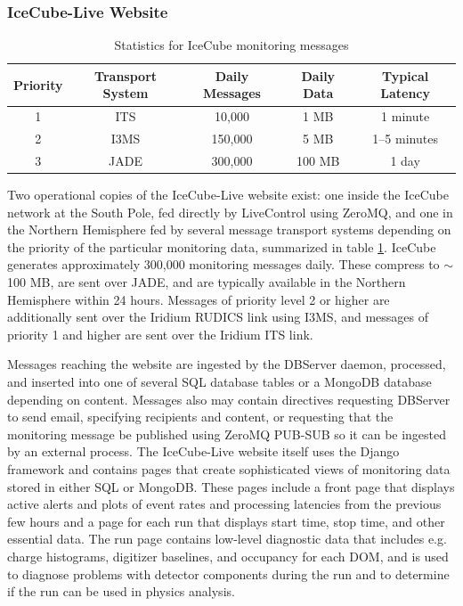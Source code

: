 \subsubsection{IceCube-Live Website}

\begin{table}[!ht]
\begin{tabular}{|c|c|c|c|c|}
\hline
Priority & Transport System & Daily Messages & Daily Data & Typical Latency\\
\hline
1 & ITS & 10,000 & 1 MB & 1 minute \\
\hline
2 & I3MS & 150,000 & 5 MB & 1--5 minutes \\
\hline
3 & JADE & 300,000 & 100 MB & 1 day \\
\hline
\end{tabular}
\caption{Statistics for IceCube monitoring messages}
\label{i3messages}
\end{table}

Two operational copies of the IceCube-Live website exist: one inside the IceCube network at the South Pole, fed directly by LiveControl using ZeroMQ, and
one in the Northern Hemisphere fed by several message transport systems depending on the priority of the particular monitoring data, summarized in table
\ref{i3messages}.  
IceCube generates approximately 300,000 monitoring messages daily.  These compress to $\sim$100 MB, are sent over JADE, and are typically available
in the Northern Hemisphere within 24 hours.  Messages of priority level 2 or higher are additionally sent over the Iridium RUDICS link using I3MS,
and messages of priority 1 and higher are sent over the Iridium ITS link.

Messages reaching the website are ingested by the DBServer daemon, processed, and inserted into one of several SQL database tables or
a MongoDB database depending on content.  Messages also may contain directives requesting DBServer to send email, specifying recipients and content,
or requesting that the monitoring message be published using ZeroMQ PUB-SUB so it can be ingested by an external process.  The IceCube-Live
website itself uses the Django framework and contains pages that create sophisticated views of monitoring data stored in either SQL or MongoDB.
These pages include a front page that displays active alerts and plots of event rates and processing latencies from the previous few hours and
a page for each run that displays start time, stop time, and other essential data.  The run page contains low-level diagnostic data that
includes e.g. charge histograms, digitizer baselines, and occupancy for each DOM, and is used to diagnose problems with detector components
during the run and to determine if the run can be used in physics analysis.

